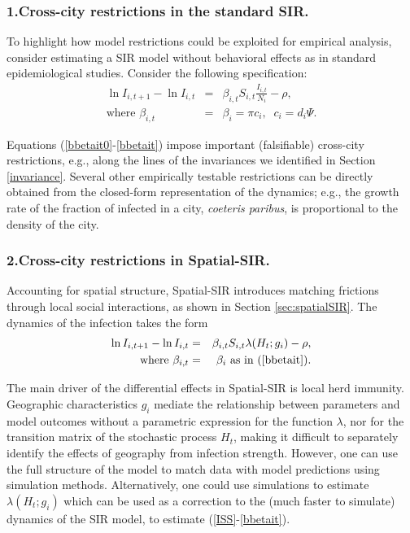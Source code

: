 \documentclass[english,11pt]{article}
\begin{document}
\subsubsection*{1.\hspace{1ex}Cross-city restrictions in the standard SIR.} 
To highlight how model restrictions could be exploited for empirical analysis, consider estimating a SIR model without behavioral
effects as in standard epidemiological studies.  Consider the following specification: 
\begin{eqnarray} 
    \ln I_{i, t+1} -\ln I_{i, t} &=& \beta_{i,t} S_{i,t} \frac{I_{i,t}}{N_i} -\rho,   \label{bbetait0} \\
    \text{where } \beta_{i,t}&=&\beta_i    =  \pi c_i, \; \;  c_i=d_i \Psi .   
    \label{bbetait}
\end{eqnarray}  
 
Equations 
(\ref{bbetait0}-\ref{bbetait}) impose important (falsifiable) cross-city restrictions, e.g., along the lines of the invariances we identified in Section \ref{invariance}. Several other empirically testable restrictions can be directly obtained from the closed-form representation of the dynamics; e.g.,  the growth rate of the fraction of infected in a city, \emph{coeteris paribus}, is proportional to the density of the city. 

\subsubsection*{2.\hspace{1ex}Cross-city restrictions in Spatial-SIR.} 

Accounting for spatial structure, Spatial-SIR introduces matching frictions through local social interactions, as shown in Section \ref{sec:spatialSIR}. The dynamics of the  infection %
takes the form 
 \begin{eqnarray}
    \ln I_{i, t+1} -\ln I_{i, t} &= &\beta_{i,t} S_{i,t} 
        \lambda (H_t;g_i)  
         -\rho, \label{ISS}   \\
 \text {where } \beta_{i,t}&= & \beta_i \text{ as in (\ref{bbetait})}. \nonumber
         \end{eqnarray}  
         
The main driver of the differential effects in Spatial-SIR is local herd immunity. Geographic characteristics $g_i$ mediate the relationship between parameters and model outcomes without a parametric expression for the function $\lambda$, nor for the transition matrix of the stochastic process $H_t$, making it difficult to separately identify the effects of geography from infection strength.
However, one can use the full structure of the model
to match data with model predictions using simulation methods. 
Alternatively,
one could use simulations to estimate $\lambda(H_t; g_i)$ which can be used as a correction to the (much faster to simulate) dynamics
of the SIR model, to estimate (\ref{ISS}-\ref{bbetait}). 
\end{document}
